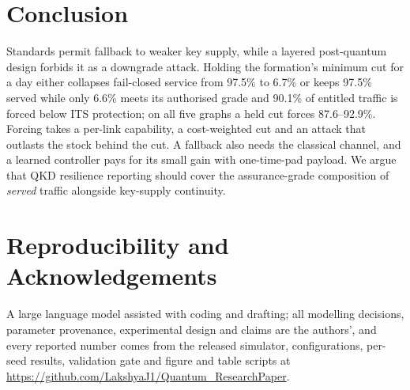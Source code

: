 \documentclass[conference,a4paper]{IEEEtran}
\begin{document}
\section{Conclusion}
Standards permit fallback to weaker key supply, while a layered post-quantum design
forbids it as a downgrade attack. Holding the formation's minimum cut for a day either
collapses fail-closed service from 97.5\% to 6.7\% or keeps 97.5\% served while only
6.6\% meets its authorised grade and 90.1\% of entitled traffic is forced below ITS
protection; on all five graphs a held cut forces 87.6--92.9\%. Forcing takes a per-link
capability, a cost-weighted cut and an attack that outlasts the stock behind the cut.
A fallback also needs the classical channel, and a learned controller pays for its
small gain with one-time-pad payload. We argue that QKD resilience reporting should
cover the assurance-grade composition of \emph{served} traffic alongside key-supply
continuity.

\section*{Reproducibility and Acknowledgements}
A large language model assisted with coding and drafting; all modelling decisions,
parameter provenance, experimental design and claims are the authors', and every
reported number comes from the released simulator, configurations, per-seed results,
validation gate and figure and table scripts at
\url{https://github.com/LakshyaJ1/Quantum_ResearchPaper}.
\end{document}
